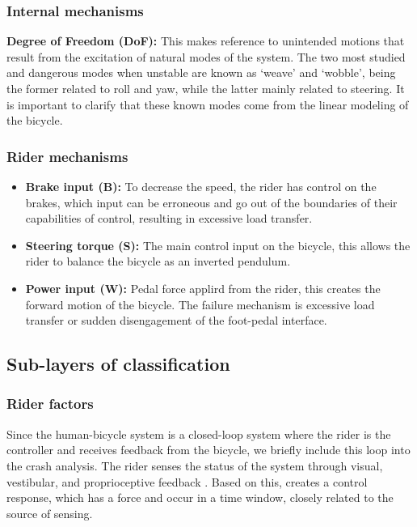 \documentclass{article}
\begin{document}
\subsubsection{Internal mechanisms}

\textbf{Degree of Freedom (DoF):} This makes reference to unintended motions that result from the excitation of natural modes of the system.
%
The two most studied and dangerous modes when unstable are known as `weave' and `wobble', being the former related to roll and yaw, while the latter mainly related to steering.
%
It is important to clarify that these known modes come from the linear modeling of the bicycle.

\subsubsection{Rider mechanisms}
\begin{itemize}
    \item \textbf{Brake input (B):} To decrease the speed, the rider has control on the brakes, which input can be erroneous and go out of the boundaries of their capabilities of control, resulting in excessive load transfer.
    \item \textbf{Steering torque (S):} The main control input on the bicycle, this allows the rider to balance the bicycle as an inverted pendulum.
    \item \textbf{Power input (W):} Pedal force applird from the rider, this creates the forward motion of the bicycle.
        The failure mechanism is excessive load transfer or sudden disengagement of the foot-pedal interface.
\end{itemize}


\subsection{Sub-layers of classification}

\subsubsection{Rider factors}

Since the human-bicycle system is a closed-loop system where the rider is the controller and receives feedback from the bicycle, we briefly include this loop into the crash analysis.
%
The rider senses the status of the system through visual, vestibular, and proprioceptive feedback \cite{Moo12}.
%
Based on this, creates a control response, which has a force and occur in a time window, closely related to the source of sensing.
\end{document}

